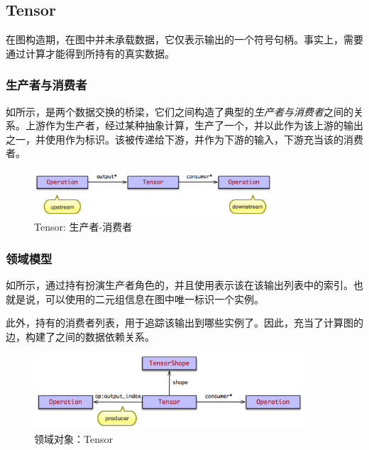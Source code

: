 \begin{content}
\subsection{Tensor}

在图构造期，在图中并未承载数据，它仅表示输出的一个符号句柄。事实上，需要通过计算才能得到所持有的真实数据。

\subsubsection{生产者与消费者}

如所示，是两个数据交换的桥梁，它们之间构造了典型的\emph{生产者与消费者}之间的关系。上游作为生产者，经过某种抽象计算，生产了一个，并以此作为该上游的输出之一，并使用作为标识。该被传递给下游，并作为下游的输入，下游充当该的消费者。

\begin{figure}[H]
\centering
\includegraphics[width=0.8\textwidth]{figures/py-tensor-producter-consumer.png}
\caption{Tensor: 生产者-消费者}
 \label{fig:py-tensor-producter-consumer}
\end{figure}

\subsubsection{领域模型}

如所示，通过持有扮演生产者角色的，并且使用表示该在该输出列表中的索引。也就是说，可以使用的二元组信息在图中唯一标识一个实例。

此外，持有的消费者列表，用于追踪该输出到哪些实例了。因此，充当了计算图的边，构建了之间的数据依赖关系。

\begin{figure}[H]
\centering
\includegraphics[width=0.9\textwidth]{figures/py-tensor.png}
\caption{领域对象：Tensor}
 \label{fig:py-tensor}
\end{figure}


\end{content}
